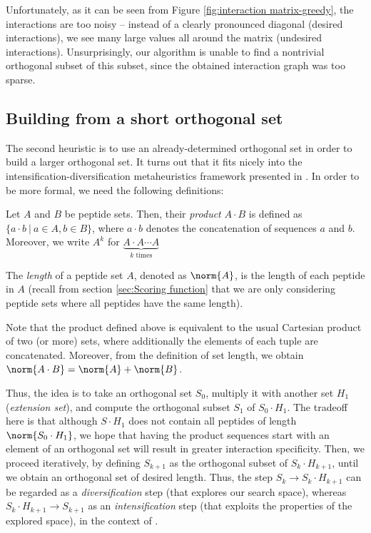 \documentclass[12pt,a4paper,titlepage,openany]{report}
\begin{document}
Unfortunately, as it can be seen from Figure \ref{fig:interaction matrix-greedy}, the interactions are too noisy -- instead of a clearly pronounced diagonal (desired interactions), we see many large values all around the matrix (undesired interactions). Unsurprisingly, our algorithm is unable to find a nontrivial orthogonal subset of this subset, since the obtained interaction graph was too sparse.

\subsection{Building from a short orthogonal set}
The second heuristic is to use an already-determined orthogonal set in order to build a larger orthogonal set. It turns out that it fits nicely into the intensification-diversification metaheuristics framework presented in \cite{blum2003metaheuristics}. In order to be more formal, we need the following definitions:

\begin{definition}
	Let $A$ and $B$ be peptide sets. Then, their \emph{product} $A\cdot B$ is defined as $\{ a\cdot b\: |\: a\in A, b\in B \}$, where $a \cdot b$ denotes the concatenation of sequences $a$ and $b$. Moreover, we write $A^k$ for
	$\underbrace{A\cdot A\cdots A}_{k \text{ times}}$
\end{definition}

\begin{definition}
	The \emph{length} of a peptide set $A$, denoted as $\norm{A}$, is the length of each peptide in $A$ (recall from section \ref{sec:Scoring function} that we are only considering peptide sets where all peptides have the same length).
\end{definition}
Note that the product defined above is equivalent to the usual Cartesian product of two (or more) sets, where additionally the elements of each tuple are concatenated. Moreover, from the definition of set length, we obtain $\norm{A \cdot B} = \norm{A} + \norm{B}$.

Thus, the idea is to take an orthogonal set $S_0$,  multiply it with another set $H_1$ (\emph{extension set}), and compute the orthogonal subset $S_1$ of $S_0 \cdot H_1$. The tradeoff here is that although $S\cdot H_1$ does not contain all peptides of length $\norm{S_0 \cdot H_1}$, we hope that having the product sequences start with an element of an orthogonal set will result in greater interaction specificity. Then, we proceed iteratively, by defining $S_{k+1}$ as the orthogonal subset of $S_k \cdot H_{k+1}$, until we obtain an orthogonal set of desired length. Thus, the step $S_k \to S_k \cdot H_{k+1}$ can be regarded as a \emph{diversification} step (that explores our search space), whereas $S_k \cdot H_{k+1} \to S_{k+1}$ as an \emph{intensification} step (that exploits the properties of the explored space), in the context of \cite{blum2003metaheuristics}.
\end{document}
